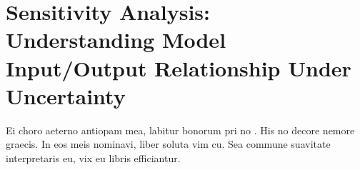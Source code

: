 \chapter[Sensitivity Analysis]{Sensitivity Analysis: Understanding Model Input/Output Relationship Under Uncertainty}\label{ch:sensitivity_analysis}
Ei choro aeterno antiopam mea, labitur bonorum pri no 
\citeauthor{taleb:2012} \citep{taleb:2012}. His no decore
nemore graecis. In eos meis nominavi, liber soluta vim cu. Sea commune
suavitate interpretaris eu, vix eu libris efficiantur.









